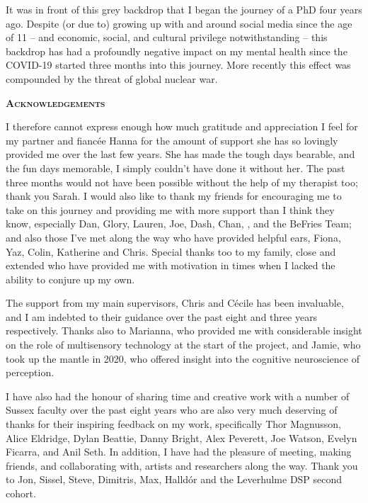 It was in front of this grey backdrop that I began the journey of a PhD four years ago. Despite (or due to) growing up with and around social media since the age of 11 -- and economic, social, and cultural privilege notwithstanding -- this backdrop has had a profoundly negative impact on my mental health since the COVID-19 started three months into this journey. More recently this effect was compounded by the threat of global nuclear war.
\clearpage

{}
\begin{flushleft}
	\Huge \textsc{\textbf{Acknowledgements}}
	
\end{flushleft}

\noindent I therefore cannot express enough how much gratitude and appreciation I feel for my partner and fiancée Hanna for the amount of support she has so lovingly provided me over the last few years. She has made the tough days bearable, and the fun days memorable, I simply couldn't have done it without her. The past three months would not have been possible without the help of my therapist too; thank you Sarah. I would also like to thank my friends for encouraging me to take on this journey and providing me with more support than I think they know, especially Dan, Glory, Lauren, Joe, Dash, Chan, , and the BeFries Team; and also those I've met along the way who have provided helpful ears, Fiona, Yaz, Colin, Katherine and Chris. Special thanks too to my family, close and extended who have provided me with motivation in times when I lacked the ability to conjure up my own.

The support from my main supervisors, Chris and C\'ecile has been invaluable, and I am indebted to their guidance over the past eight and three years respectively. Thanks also to Marianna, who provided me with considerable insight on the role of multisensory technology at the start of the project, and Jamie, who took up the mantle in 2020, who offered insight into the cognitive neuroscience of perception.

I have also had the honour of sharing time and creative work with a number of Sussex faculty over the past eight years who are also very much deserving of thanks for their inspiring feedback on my work, specifically Thor Magnusson, Alice Eldridge, Dylan Beattie, Danny Bright, Alex Peverett, Joe Watson, Evelyn Ficarra, and Anil Seth. In addition, I have had the pleasure of meeting, making friends, and collaborating with, artists and researchers along the way. Thank you to Jon, Sissel, Steve, Dimitris, Max, Halld\'or and the Leverhulme DSP second cohort.

